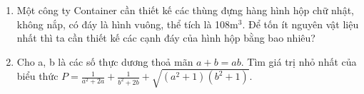\begin{ex}
{\begin{center}
		
	\end{center}
	}
\end{ex}

\begin{ex}
	\begin{enumerate}
		\item[a)] Một công ty Container cần thiết kế các thùng đựng hàng hình hộp chữ nhật, không nắp, có đáy là hình vuông, thể tích là 108m$^3$. Để tốn ít nguyên vật liệu nhất thì ta cần thiết kế các cạnh đáy của hình hộp bằng bao nhiêu?
		\item[b)] Cho a, b là các số thực dương thoả mãn $a + b = ab$. Tìm giá trị nhỏ nhất của biểu thức $P = \frac{1}{a^2+2a} + \frac{1}{b^2+2b} + \sqrt{(a^2+1)(b^2+1)}$.
	\end{enumerate}
\end{ex}



